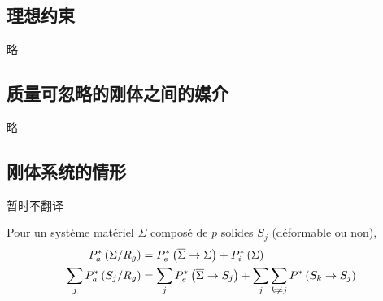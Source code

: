 \documentclass[UTF8]{ctexart}%
\begin{document}
\subsection{理想约束}
\label{sec:理想约束}
略

\subsection{质量可忽略的刚体之间的媒介}
\label{sec:质量可忽略的刚体之间的媒介}
略

%
%
%


\subsection{刚体系统的情形}
\label{sec:刚体系统的情形}
暂时不翻译

Pour un système matériel $\Sigma$ composé de $p$ solides $S_j$ (déformable ou non),
\begin{align}
P_a^{\ast}\left(\Sigma/R_g\right)&=P_e^{\ast}\left(\overline{\Sigma}\rightarrow\Sigma\right)+P_i^{\ast}\left(\Sigma\right) \notag \\
\sum_{j}P_a^{\ast}\left(S_j/R_g\right)&=\sum_{j}P_e^{\ast}\left(\overline{\Sigma}\rightarrow S_j\right)+\sum_j \sum_{k\neq j} P^{\ast}\left(S_k\rightarrow S_j\right)
\end{align}
\end{document}
